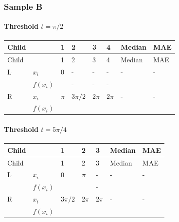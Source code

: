 \documentclass{course_sheet}
\begin{document}
\subsubsection*{Sample B}
\paragraph*{Threshold $t=\pi/2$}
\begingroup
\small
\setlength{\tabcolsep}{4pt}
\begin{longtable}{l|l|l|l|l|l|l|l}
Child &  & 1 & 2 & 3 & 4 & Median & MAE \\
\hline
\endfirsthead
Child &  & 1 & 2 & 3 & 4 & Median & MAE \\
\hline
\endhead
L & $x_i$ & $0$ & - & - & - & - & - \\[3pt]
 & $f(x_i)$ & $\phantom{0}$ & - & - & - & $\phantom{0}$ & $\phantom{0}$ \\[3pt]
R & $x_i$ & $\pi$ & $3\pi/2$ & $2\pi$ & $2\pi$ & - & - \\[3pt]
 & $f(x_i)$ & $\phantom{0}$ & $\phantom{0}$ & $\phantom{0}$ & $\phantom{0}$ & $\phantom{0}$ & $\phantom{0}$ \\[3pt]
\end{longtable}
\endgroup
\paragraph*{Threshold $t=5\pi/4$}
\begingroup
\small
\setlength{\tabcolsep}{4pt}
\begin{longtable}{l|l|l|l|l|l|l}
Child &  & 1 & 2 & 3 & Median & MAE \\
\hline
\endfirsthead
Child &  & 1 & 2 & 3 & Median & MAE \\
\hline
\endhead
L & $x_i$ & $0$ & $\pi$ & - & - & - \\[3pt]
 & $f(x_i)$ & $\phantom{0}$ & $\phantom{0}$ & - & $\phantom{0}$ & $\phantom{0}$ \\[3pt]
R & $x_i$ & $3\pi/2$ & $2\pi$ & $2\pi$ & - & - \\[3pt]
 & $f(x_i)$ & $\phantom{0}$ & $\phantom{0}$ & $\phantom{0}$ & $\phantom{0}$ & $\phantom{0}$ \\[3pt]
\end{longtable}
\endgroup
\end{document}
